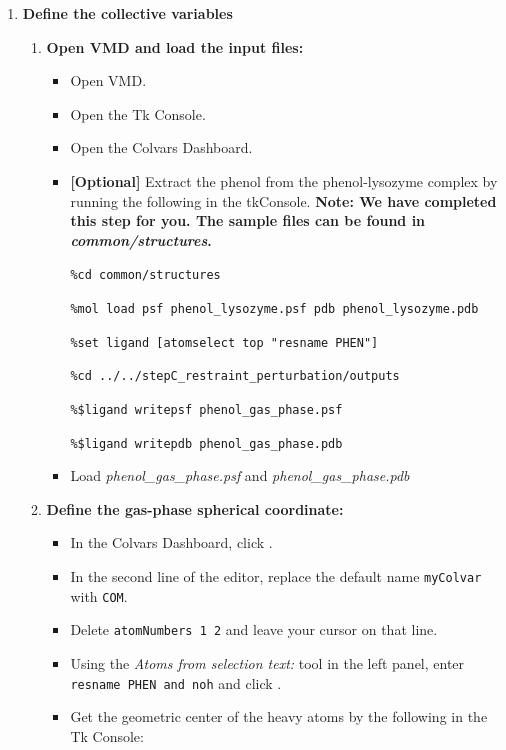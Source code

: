 \documentclass[9pt,tutorial]{Styling/livecoms}
\newcommand{\tkconsole}[1]{\texttt{\%#1}}
\newcommand{\filepath}[1]{\textit{#1}}
\newcommand{\button}[1]{\inlineBox[gray]{\texttt{#1}}}
\newcommand{\menu}[1]{\textit{#1}}
\newcommand{\textInput}[1]{\texttt{#1}}
\begin{document}
    \begin{enumerate}%
    
        \item \textbf{Define the collective variables}
        \begin{enumerate}[label=\alph*., ref=\theenumi.\alph*]
            \item \textbf{Open VMD and load the input files:}
            \begin{itemize}
                \item Open VMD.
                \item Open the Tk Console.
                \item Open the Colvars Dashboard.
                \item \textbf{[Optional]} Extract the phenol from the phenol-lysozyme complex by running the following in the tkConsole. \textbf{Note: We have completed this step for you. The sample files can be found in \filepath{common/structures}.}
            
                \tkconsole{cd common/structures}
                
                \tkconsole{mol load psf phenol\_lysozyme.psf pdb phenol\_lysozyme.pdb}
                
                \tkconsole{set ligand [atomselect top "resname PHEN"]}
                
                \tkconsole{cd ../../stepC\_restraint\_perturbation/outputs}
                
                \tkconsole{\$ligand writepsf phenol\_gas\_phase.psf}
                
                \tkconsole{\$ligand writepdb phenol\_gas\_phase.pdb}
                
                \item Load \filepath{phenol\_gas\_phase.psf} and \filepath{phenol\_gas\_phase.pdb}
                
                \end{itemize}

            \item \textbf{Define the gas-phase spherical coordinate:} \label{step:defineGasRestraints}
            \begin{itemize}
                \item In the Colvars Dashboard, click \button{New [Ctrl-n]}.
                \item In the second line of the editor, replace the default name \textInput{myColvar} with \textInput{COM}.
                \item Delete \textInput{atomNumbers 1 2} and leave your cursor on that line.
                \item Using the \menu{Atoms from selection text:} tool in the left panel, enter \textInput{resname PHEN and noh} and click \button{Insert [Enter]}.
                \item Get the geometric center of the heavy atoms by  the following in the Tk Console:
                

\end{itemize}
\end{enumerate}
\end{enumerate}
\end{document}
